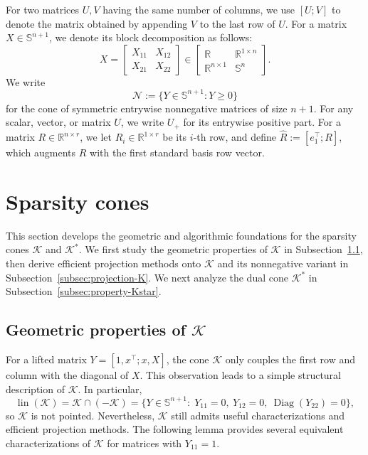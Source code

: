 \documentclass[11pt]{article}
\DeclareMathOperator{\Diag}{Diag}
\def\K{\mathcal{K}}
\def\R{\mathbb{R}}
\def\S{\mathbb{S}}
\def\lin{{\operatorname{lin}}}
\theoremstyle{plain}
\begin{document}
For two matrices $U,V$ having the same number of columns, we use
$[U;V]$ to denote the matrix obtained by appending $V$ to the last row
of $U$.
For a matrix $X\in\S^{n+1}$, we denote its block decomposition as follows:
\begin{equation}
X=
\begin{bmatrix}
X_{11} & X_{12}\\
X_{21} & X_{22}
\end{bmatrix}
\in
\begin{bmatrix}
\R & \R^{1\times n}\\
\R^{n\times 1} & \S^n
\end{bmatrix}.
\end{equation}
We write
\begin{equation}
\label{eq:nonnegative-cone}
\mathcal{N}:=\{Y\in\S^{n+1}:Y\ge 0\}
\end{equation}
for the cone of symmetric entrywise nonnegative matrices of size $n+1$.
For any scalar, vector, or matrix $U$, we write $U_+$ for its entrywise
positive part.
For a matrix $R\in\R^{n\times r}$, we let $R_i\in\R^{1\times r}$ be its $i$-th row, and define $\widehat{R}:=[e_1^\top;R]$, which augments $R$ with the first standard basis row vector.



\section{Sparsity cones}\label{sec:cone-geometry}

This section develops the geometric and algorithmic foundations for the sparsity cones $\K$ and $\K^*$. We first study the geometric properties of $\K$ in Subsection~\ref{subsec:property-K}, then derive efficient projection methods onto $\K$ and its nonnegative variant in Subsection~\ref{subsec:projection-K}. We next analyze the dual cone $\K^*$ in Subsection~\ref{subsec:property-Kstar}.

\subsection{Geometric properties of \texorpdfstring{$\K$}{K}}\label{subsec:property-K}

For a lifted matrix $Y=[1,x^\top; x, X]$, the cone $\K$ only couples the first row and column with the diagonal of $X$. This observation leads to a simple structural description of $\K$. In particular,
\begin{equation*}
\lin(\K)
=\K\cap(-\K)=\{Y\in\S^{n+1}:\; Y_{11}=0,\ Y_{12}=0,\ \Diag(Y_{22})=0\},
\end{equation*}
so $\K$ is not pointed. Nevertheless, $\K$ still admits useful characterizations and efficient projection methods.
The following lemma provides several equivalent characterizations of $\K$ for matrices with $Y_{11}=1$.
\end{document}
